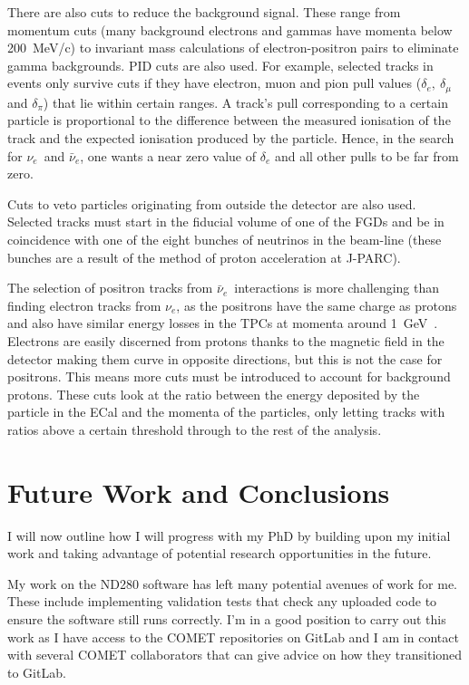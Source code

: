 \documentclass[aps,pra,12pt,notitlepage,tightenlines]{revtex4-1}
\newcommand{\nue}{$\nu_e$}
\newcommand{\anue}{$\bar\nu_e$}
\begin{document}
There are also cuts to reduce the background signal. These range from momentum cuts (many background electrons and gammas have momenta below 200~MeV/c) to invariant mass calculations of electron-positron pairs to eliminate gamma backgrounds. PID cuts are also used. For example, selected tracks in events only survive cuts if they have electron, muon and pion pull values ($\delta_e, \ \delta_\mu$ and $\delta_\pi$) that lie within certain ranges. A track's pull corresponding to a certain particle is proportional to the difference between the measured ionisation of the track and the expected ionisation produced by the particle. Hence, in the search for \nue \ and \anue, one wants a near zero value of $\delta_e$ and all other pulls to be far from zero.

Cuts to veto particles originating from outside the detector are also used. Selected tracks must start in the fiducial volume of one of the FGDs and be in coincidence with one of the eight bunches of neutrinos in the beam-line (these bunches are a result of the method of proton acceleration at J-PARC).

The selection of positron tracks from \anue \ interactions is more challenging than finding electron tracks from \nue, as the positrons have the same charge as protons and also have similar energy losses in the TPCs at momenta around 1~GeV~\cite{Giganti2013}. Electrons are easily discerned from protons thanks to the magnetic field in the detector making them curve in opposite directions, but this is not the case for positrons. This means more cuts must be introduced to account for background protons. These cuts look at the ratio between the energy deposited by the particle in the ECal and the momenta of the particles, only letting tracks with ratios above a certain threshold through to the rest of the analysis.

\section{Future Work and Conclusions}
I will now outline how I will progress with my PhD by building upon my initial work and taking advantage of potential research opportunities in the future.

My work on the ND280 software has left many potential avenues of work for me. These include implementing validation tests that check any uploaded code to ensure the software still runs correctly. I'm in a good position to carry out this work as I have access to the COMET repositories on GitLab and I am in contact with several COMET collaborators that can give advice on how they transitioned to GitLab.
\end{document}
